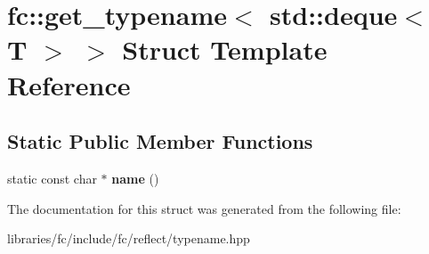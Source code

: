\hypertarget{structfc_1_1get__typename_3_01std_1_1deque_3_01_t_01_4_01_4}{}\section{fc\+:\+:get\+\_\+typename$<$ std\+:\+:deque$<$ T $>$ $>$ Struct Template Reference}
\label{structfc_1_1get__typename_3_01std_1_1deque_3_01_t_01_4_01_4}
\subsection*{Static Public Member Functions}
\begin{DoxyCompactItemize}
\item 
\mbox{\label{structfc_1_1get__typename_3_01std_1_1deque_3_01_t_01_4_01_4_af2c1dbf4ff9a914a07d92ec6bc85be51}} 
static const char $\ast$ {\bfseries name} ()
\end{DoxyCompactItemize}


The documentation for this struct was generated from the following file\+:\begin{DoxyCompactItemize}
\item 
libraries/fc/include/fc/reflect/typename.\+hpp\end{DoxyCompactItemize}
